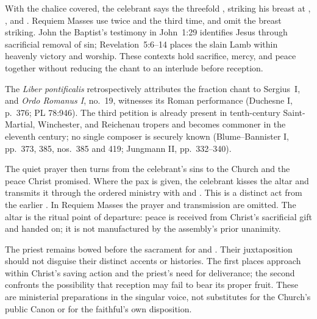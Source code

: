 With the chalice covered, the celebrant says the threefold , striking his breast at , , and . Requiem Masses use  twice and  the third time, and omit the breast striking. John the Baptist's testimony in John~1:29 identifies Jesus through sacrificial removal of sin; Revelation~5:6--14 places the slain Lamb within heavenly victory and worship. These contexts hold sacrifice, mercy, and peace together without reducing the chant to an interlude before reception.

The \emph{Liber pontificalis} retrospectively attributes the fraction chant to Sergius~I, and \emph{Ordo Romanus I}, no.~19, witnesses its Roman performance (Duchesne I, p.~376; PL 78:946). The third petition  is already present in tenth-century Saint-Martial, Winchester, and Reichenau tropers and becomes commoner in the eleventh century; no single composer is securely known (Blume--Bannister I, pp.~373, 385, nos.~385 and 419; Jungmann II, pp.~332--340).

The quiet prayer  then turns from the celebrant's sins to the Church and the peace Christ promised. Where the pax is given, the celebrant kisses the altar and transmits it through the ordered ministry with  and . This is a distinct act from the earlier . In Requiem Masses the prayer and transmission are omitted. The altar is the ritual point of departure: peace is received from Christ's sacrificial gift and handed on; it is not manufactured by the assembly's prior unanimity.


The priest remains bowed before the sacrament for  and . Their juxtaposition should not disguise their distinct accents or histories. The first places approach within Christ's saving action and the priest's need for deliverance; the second confronts the possibility that reception may fail to bear its proper fruit. These are ministerial preparations in the singular voice, not substitutes for the Church's public Canon or for the faithful's own disposition.

